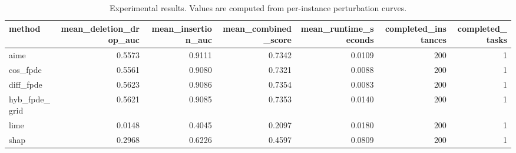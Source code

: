 \begin{table}[t]
\caption{Experimental results. Values are computed from per-instance perturbation curves.}
\label{tab:main_results_computed}
\centering
\begin{tabular}{lrrrrrr}
\toprule
method & mean\_deletion\_drop\_auc & mean\_insertion\_auc & mean\_combined\_score & mean\_runtime\_seconds & completed\_instances & completed\_tasks \\
\midrule
aime & 0.5573 & 0.9111 & 0.7342 & 0.0109 & 200 & 1 \\
cos\_fpde & 0.5561 & 0.9080 & 0.7321 & 0.0088 & 200 & 1 \\
diff\_fpde & 0.5623 & 0.9086 & 0.7354 & 0.0083 & 200 & 1 \\
hyb\_fpde\_grid & 0.5621 & 0.9085 & 0.7353 & 0.0140 & 200 & 1 \\
lime & 0.0148 & 0.4045 & 0.2097 & 0.0180 & 200 & 1 \\
shap & 0.2968 & 0.6226 & 0.4597 & 0.0809 & 200 & 1 \\
\bottomrule
\end{tabular}

\end{table}
